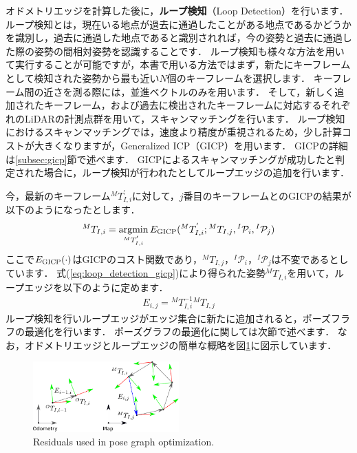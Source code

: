 オドメトリエッジを計算した後に，{\bf ループ検知}（Loop Detection）を行います．
ループ検知とは，現在いる地点が過去に通過したことがある地点であるかどうかを識別し，過去に通過した地点であると識別されれば，今の姿勢と過去に通過した際の姿勢の間相対姿勢を認識することです．
ループ検知も様々な方法を用いて実行することが可能ですが，本書で用いる方法ではまず，新たにキーフレームとして検知された姿勢から最も近い$N$個のキーフレームを選択します．
キーフレーム間の近さを測る際には，並進ベクトルのみを用います．
そして，新しく追加されたキーフレーム，および過去に検出されたキーフレームに対応するそれぞれのLiDARの計測点群を用いて，スキャンマッチングを行います．
ループ検知におけるスキャンマッチングでは，速度より精度が重視されるため，少し計算コストが大きくなりますが，Generalized ICP（GICP）\cite{SegalRSS2009GICP}を用います．
GICPの詳細は\ref{subsec:gicp}節で述べます．
GICPによるスキャンマッチングが成功したと判定された場合に，ループ検知が行われたとしてループエッジの追加を行います．

今，最新のキーフレーム${}^{M}T_{I, i}^{'}$に対して，$j$番目のキーフレームとのGICPの結果が以下のようになったとします．
%
\begin{align}
  {}^{M}T_{I, i} = \mathop{\rm argmin}\limits_{ {}^{M}T_{I, i}^{'} } E_{\rm GICP}({}^{M}T_{I, i}^{'}; {}^{M}T_{I, j}, {}^{I}\mathcal{P}_{i}, {}^{I}\mathcal{P}_{j})
  \label{eq:loop_detection_gicp}
\end{align}
%
ここで$E_{\rm GICP}(\cdot)$はGICPのコスト関数であり，${}^{M}T_{I, j}$，${}^{I}\mathcal{P}_{i}$，${}^{I}\mathcal{P}_{j}$は不変であるとしています．
式(\ref{eq:loop_detection_gicp})により得られた姿勢${}^{M}T_{I, i}$を用いて，ループエッジを以下のように定めます．
%
\begin{align}
  E_{i, j} = {}^{M}T_{I, i}^{-1} {}^{M}T_{I, j}
  \label{eq:loop_edge}
\end{align}
%
ループ検知を行いループエッジがエッジ集合に新たに追加されると，ポーズフラフの最適化を行います．
ポーズグラフの最適化に関しては次節で述べます．
なお，オドメトリエッジとループエッジの簡単な概略を図\ref{fig:graph_slam_residuals}に図示しています．

\begin{figure}[!t]
  \centering
  \includegraphics[width=0.5\textwidth]{../figs/graph_slam_residuals.pdf}
  \caption{Residuals used in pose graph optimization.}
  \label{fig:graph_slam_residuals}
\end{figure}
















